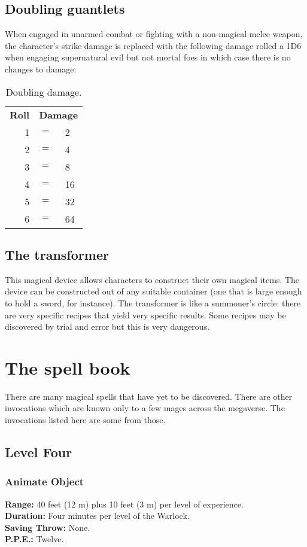 \subsection{Doubling guantlets}
When engaged in unarmed combat or fighting with a 
non-magical melee weapon,
the character's strike damage is replaced with the following
damage rolled a 1D6 when engaging supernatural evil but not mortal
foes in which case there is no changes to damage:
\begin{table}[h]
\centering
\begin{tabular}{rll}
\toprule
{\bfseries Roll} & \multicolumn{2}{c}{{\bfseries Damage}} \\ 
1&$=$&2 \\ 
2&$=$&4 \\ 
3&$=$&8 \\ 
4&$=$&16 \\ 
5&$=$&32 \\ 
6&$=$&64 \\
\bottomrule
\end{tabular}
\caption{Doubling damage.}
\label{table-doublingchaos}
\end{table}

\subsection{The transformer}
This magical device allows characters to construct their own
magical items.
The device can be constructed out of any suitable container
(one that is large enough to hold a sword, for instance).
The transformer is like a summoner's circle:
there are very specific recipes that yield very
specific results.
Some recipes may be discovered by trial and error
but this is very dangerous.

\section{The spell book}
There are many magical spells that have yet to be
discovered.
There are other invocations which
are known only to a
few mages across the megaverse.
The invocations listed here are some from those.

\subsection{Level Four}\label{sect:level-four-spells}
\subsubsection{Animate Object}
{\bfseries Range:} 40 feet (12 m) plus 10 feet (3 m)
per level of experience.\\
{\bfseries Duration:} Four
minutes per level of the Warlock.\\
{\bfseries Saving Throw:} None.\\
{\bfseries P.P.E.:} Twelve.

